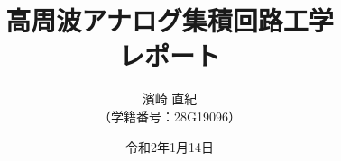 \documentclass[a4paper]{jsarticle}
\title{\Huge 高周波アナログ集積回路工学\\\huge レポート\vspace{120mm}}
\author{\Large 濱崎 直紀\\\large （学籍番号：28G19096）\vspace{25mm}}
\date{令和2年1月14日}
\begin{document}
\begin{titlepage}
\maketitle
\thispagestyle{empty}
\end{titlepage}


\clearpage

\end{document}
